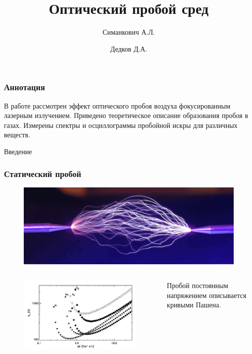 \documentclass{beamer}
\title[About Beamer] %
{Оптический пробой сред}
\author[Arthur, Doe] %
{Симанкович А.Л. \and Дедков Д.А. }
\institute[VFU] %
{
	Московский Физико-Технический Институт
}
\date[VLC 2023] %
\begin{document}
	
	\frame{\titlepage}
	
	\begin{frame}
		\frametitle{Аннотация}
				
		В работе рассмотрен эффект оптического пробоя воздуха фокусированным лазерным излучением. Приведено теоретическое описание образования пробоя в газах. Измерены спектры и осциллограммы пробойной искры для различных веществ.
		
	\end{frame}


	\begin{frame}[plain,c]
		
		\begin{center}
			\huge {} Введение
		\end{center}
	
	\end{frame}
	
	
	\begin{frame}
		\frametitle{Статический пробой}

		\begin{figure}
			\includegraphics[width=0.8\linewidth]{res/const_discharge.jpg}
		\end{figure}
		
		\begin{columns}
			\begin{figure}
				\includegraphics[width=\linewidth]{res/paschen.jpg}
			\end{figure}

			Пробой постоянным напряжением описывается кривыми Пашена.
		\end{columns}

	\end{frame}
\end{document}
